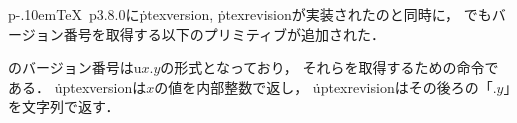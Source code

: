 \documentclass[uplatex,a4paper,11pt,nomag]{jsarticle}
\def\pTeX{p\kern-.10em\TeX}
\begin{document}
\pTeX~p3.8.0に\.{ptexversion}, \.{ptexrevision}が実装されたのと同時に，
\upTeX でもバージョン番号を取得する以下のプリミティブが追加された．

\begin{cslist}
  \upTeX のバージョン番号はu$x{.}y$の形式となっており，
  それらを取得するための命令である．
  \.{uptexversion}は$x$の値を内部整数で返し，
  \.{uptexrevision}はその後ろの「${.}y$」を文字列で返す．
\end{cslist}


\newpage


\begin{thebibliography}{99}
\end{thebibliography}

\newpage
\printindex
\end{document}
